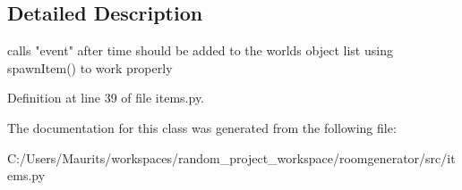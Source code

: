 \subsection{Detailed Description}
\begin{DoxyVerb}calls "event" after time
should be added to the worlds object list using spawnItem()
to work properly\end{DoxyVerb}
 

Definition at line 39 of file items.\+py.



The documentation for this class was generated from the following file\+:\begin{DoxyCompactItemize}
\item 
C\+:/\+Users/\+Maurits/workspaces/random\+\_\+project\+\_\+workspace/roomgenerator/src/items.\+py\end{DoxyCompactItemize}
